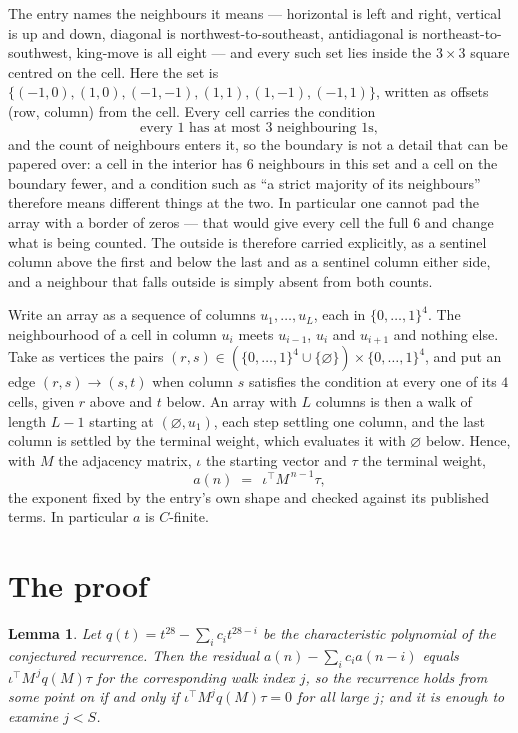 \documentclass[11pt,a4paper]{article}
\theoremstyle{plain}
\newtheorem{lemma}[theorem]{Lemma}
\theoremstyle{definition}
\begin{document}
The entry names the neighbours it means --- horizontal is left and right, vertical is up and
down, diagonal is northwest-to-southeast, antidiagonal is northeast-to-southwest, king-move is
all eight --- and every such set lies inside the $3\times3$ square centred on the cell. Here
the set is $\{(-1,0), (1,0), (-1,-1), (1,1), (1,-1), (-1,1)\}$, written as offsets (row, column) from the cell. Every cell carries
the condition
\[
\text{every 1 has at most 3 neighbouring 1s},
\]
and the count of neighbours enters it, so the boundary is not a detail that can be papered
over: a cell in the interior has $6$ neighbours in this set and a cell on the boundary
fewer, and a condition such as ``a strict majority of its neighbours'' therefore means
different things at the two. In particular one cannot pad the array with a border of zeros ---
that would give every cell the full $6$ and change what is being counted. The outside is
therefore carried
explicitly, as a sentinel column above the first and below the last and as a sentinel column
either side, and a neighbour that falls outside is simply absent from both counts.

Write an array as a sequence of columns $u_1,\dots,u_L$, each in
$\{0,\dots,1\}^{4}$. The neighbourhood of a cell in column $u_i$ meets $u_{i-1}$,
$u_i$ and $u_{i+1}$ and nothing else. Take as vertices the pairs
$(r,s)\in(\{0,\dots,1\}^{4}\cup\{\varnothing\})\times\{0,\dots,1\}^{4}$,
and put an edge $(r,s)\to(s,t)$ when column $s$ satisfies the condition at every one of its
$4$ cells, given $r$ above and $t$ below. An array with $L$ columns is then a walk of length
$L-1$ starting at $(\varnothing,u_1)$, each step settling one column, and the last column is
settled by the terminal weight, which evaluates it with $\varnothing$ below. Hence,
with $M$ the adjacency matrix, $\iota$ the starting vector and $\tau$ the terminal weight,
\[
a(n)\;=\;\,\iota^{\!\top}M^{\,n-1}\tau ,
\]
the exponent fixed by the entry's own shape and checked against its published terms. In
particular $a$ is $C$-finite.

\section{The proof}

\begin{lemma}\label{lem:crit}
Let $q(t)=t^{28}-\sum_i c_it^{28-i}$ be the characteristic polynomial of the
conjectured recurrence. Then the residual $a(n)-\sum_ic_ia(n-i)$ equals
$\iota^{\!\top}M^{\,j}q(M)\tau$ for the corresponding walk index $j$, so the
recurrence holds from some point on if and only if $\iota^{\!\top}M^{j}q(M)\tau=0$ for all
large $j$; and it is enough to examine $j<S$.
\end{lemma}
\end{document}
